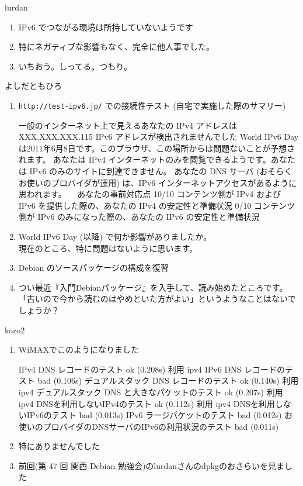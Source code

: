 \documentclass[mingoth,a4paper]{jsarticle}
\begin{document}
\begin{prework}{ lurdan }
  \begin{enumerate}
  \item IPv6 でつながる環境は所持していないようです
  \item 特にネガティブな影響もなく、完全に他人事でした。
  \item いちおう。しってる。つもり。
  \end{enumerate}
\end{prework}

\begin{prework}{ よしだともひろ }
  \begin{enumerate}
  \item {\tt{http://test-ipv6.jp/}} での接続性テスト
    (自宅で実施した際のサマリー)
\begin{commandline}
一般のインターネット上で見えるあなたの IPv4 アドレスはXXX.XXX.XXX.115
IPv6 アドレスが検出されませんでした
World IPv6 Dayは2011年6月8日です。このブラウザ、この場所からは問題ないことが予想されます。
あなたは IPv4 インターネットのみを閲覧できるようです。あなたは IPv6 のみのサイトに到達できません。
あなたの DNS サーバ (おそらくお使いのプロバイダが運用) は、IPv6 インターネットアクセスがあるように思われます。
　あなたの事前対応点
10/10  コンテンツ側が IPv4 および IPv6 を提供した際の、あなたの IPv4 の安定性と準備状況
 0/10  コンテンツ側が IPv6 のみになった際の、あなたの IPv6 の安定性と準備状況
\end{commandline}
  \item World IPv6 Day (以降) で何か影響がありましたか。 \\
    現在のところ、特に問題はないように思います。
  \item Debian のソースパッケージの構成を復習
  \item
つい最近『入門Debianパッケージ』を入手して、読み始めたところです。「古いので今から読むのはやめといた方がよい」というようなことはないでしょうか？
  \end{enumerate}
\end{prework}

\begin{prework}{ kozo2 }
  \begin{enumerate}
  \item WiMAXでこのようになりました
\begin{commandline}
IPv4 DNS レコードのテスト
ok (0.208s) 利用 ipv4
IPv6 DNS レコードのテスト
bad (0.106s)
デュアルスタック DNS レコードのテスト
ok (0.140s) 利用 ipv4
デュアルスタック DNS と大きなパケットのテスト
ok (0.207s) 利用 ipv4
DNSを利用しないIPv4のテスト
ok (0.112s) 利用 ipv4
DNSを利用しないIPv6のテスト
bad (0.013s)
IPv6 ラージパケットのテスト
bad (0.012s)
お使いのプロバイダのDNSサーバのIPv6の利用状況のテスト
bad (0.011s)
\end{commandline}
  \item 特にありませんでした
  \item 前回(第 47 回 関西 Debian 勉強会)のlurdanさんのdpkgのおさらいを見ました
  \end{enumerate}
\end{prework}
\end{document}
